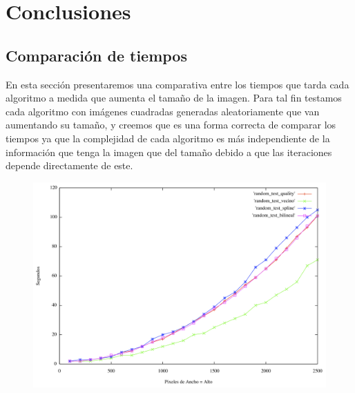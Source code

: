 \section{Conclusiones}

\subsection{Comparación de tiempos}

En esta sección presentaremos una comparativa entre los tiempos que tarda cada algoritmo a medida que aumenta el tamaño de la imagen. Para tal fin testamos cada algoritmo con imágenes cuadradas generadas aleatoriamente que van aumentando su tamaño, y creemos que es una forma correcta de comparar los tiempos ya que la complejidad de cada algoritmo es más independiente de la información que tenga la imagen que del tamaño debido a que las iteraciones depende directamente de este.

\begin{figure}[h]
       \includegraphics[width=1\textwidth]{imagenes/tiempo_algoritmos_random.png}
\end{figure}

